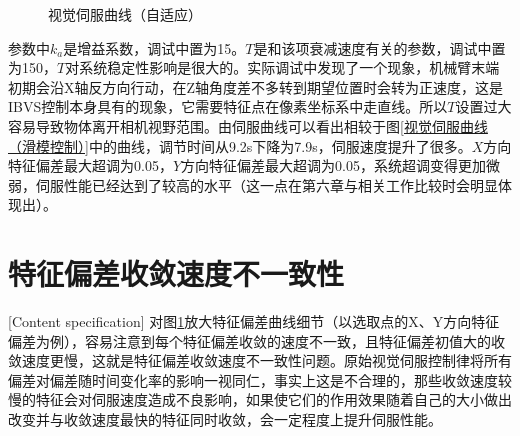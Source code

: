 \documentclass[fontset=fandol,type=bachelor,campus=harbin,bsmainpagenumberline=true]{hithesisbook}
\begin{document}
\begin{figure}[h]
{\begin{minipage}[h]{0.40\textwidth}
		\end{minipage}
		\label{视觉伺服曲线（自适应）c}
	}
	\caption{视觉伺服曲线（自适应）}
	\label{视觉伺服曲线（自适应）}
\end{figure}


参数中$k_a$是增益系数，调试中置为15。$T$是和该项衰减速度有关的参数，调试中置为150，$T$对系统稳定性影响是很大的。实际调试中发现了一个现象，机械臂末端初期会沿X轴反方向行动，在Z轴角度差不多转到期望位置时会转为正速度，这是IBVS控制本身具有的现象，它需要特征点在像素坐标系中走直线。所以$T$设置过大容易导致物体离开相机视野范围。由伺服曲线可以看出相较于图\ref{视觉伺服曲线（滑模控制）}中的曲线，调节时间从9.2s下降为7.9s，伺服速度提升了很多。$X$方向特征偏差最大超调为0.05，$Y$方向特征偏差最大超调为0.05，系统超调变得更加微弱，伺服性能已经达到了较高的水平（这一点在第六章与相关工作比较时会明显体现出）。


\section{特征偏差收敛速度不一致性}[Content specification]
对图\ref{视觉伺服曲线（自适应）}放大特征偏差曲线细节（以选取点的X、Y方向特征偏差为例），容易注意到每个特征偏差收敛的速度不一致，且特征偏差初值大的收敛速度更慢，这就是特征偏差收敛速度不一致性问题。原始视觉伺服控制律将所有偏差对偏差随时间变化率的影响一视同仁，事实上这是不合理的，那些收敛速度较慢的特征会对伺服速度造成不良影响，如果使它们的作用效果随着自己的大小做出改变并与收敛速度最快的特征同时收敛，会一定程度上提升伺服性能。
\end{document}
